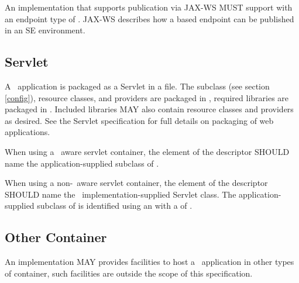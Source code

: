 An implementation that supports publication via JAX-WS MUST support  with an endpoint type of . JAX-WS describes how a  based endpoint can be published in an SE environment.

\subsection{Servlet}

A \jaxrs\ application is packaged as a Servlet in a  file. The  subclass (see section \ref{config}), resource classes, and providers are packaged in , required libraries are packaged in . Included libraries MAY also contain resource classes and providers as desired. See the Servlet specification for full details on packaging of web applications.

When using a \jaxrs\ aware servlet container, the  element of the  descriptor SHOULD name the application-supplied subclass of .

When using a non-\jaxrs\ aware servlet container, the  element of the  descriptor SHOULD name the \jaxrs\ implementation-supplied Servlet class. The application-supplied subclass of  is identified using an  with a  of .

\subsection{Other Container}

An implementation MAY provides facilities to host a \jaxrs\ application in other types of container, such facilities are outside the scope of this specification.